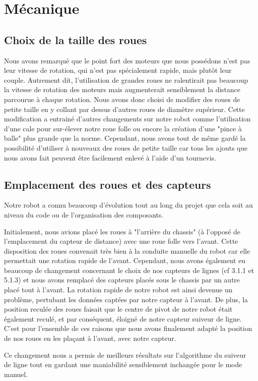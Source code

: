 \section{Mécanique}
\subsection{Choix de la taille des roues}

Nous avons remarqué que le point fort des moteurs que nous possédons n'est pas leur vitesse de rotation, qui n'est pas spécialement rapide, mais plutôt leur couple. Autrement dit, l'utilisation de grandes roues ne ralentirait pas beaucoup la vitesse de rotation des moteurs mais augmenterait sensiblement la distance parcourue à chaque rotation. Nous avons donc choisi de modifier des roues de petite taille en y collant par dessus d'autres roues de diamètre supérieur. Cette modification a entrainé d'autres changements sur notre robot comme l'utilisation d'une cale pour sur-élever notre roue folle ou encore la création d'une "pince à balle" plus grande que la norme. Cependant, nous avons tout de même gardé la possibilité d'utiliser à nouveaux des roues de petite taille car tous les ajouts que nous avons fait peuvent être facilement enlevé à l'aide d'un tournevis.

\subsection{Emplacement des roues et des capteurs}
Notre robot a connu beaucoup d'évolution tout au long du projet que cela soit au niveau du code ou de l'organisation des composants.

Initialement, nous avions placé les roues à "l'arrière du chassis" (à l'opposé de l'emplacement du capteur de distance) avec une roue folle vers l'avant. Cette disposition des roues convenait très bien à la conduite manuelle du robot car elle permettait une rotation rapide de l'avant. Cependant, nous avons également eu beaucoup de changement concernant le choix de nos capteurs de lignes (cf 3.1.1 et 5.1.3) et nous avons remplacé des capteurs placés sous le chassis par un autre placé tout à l'avant. La rotation rapide de notre robot est ainsi devenue un problème, pertubant les données captées par notre capteur à l'avant. De plus, la position reculée des roues faisait que le centre de pivot de notre robot était également reculé, et par conséquent, éloigné de notre capteur suiveur de ligne. C'est pour l'ensemble de ces raisons que nous avons finalement adapté la position de nos roues en les plaçant à l'avant, avec notre capteur.

Ce changement nous a permis de meilleurs résultats sur l'algorithme du suiveur de ligne tout en gardant une maniabilité sensiblement inchangée pour le mode manuel.